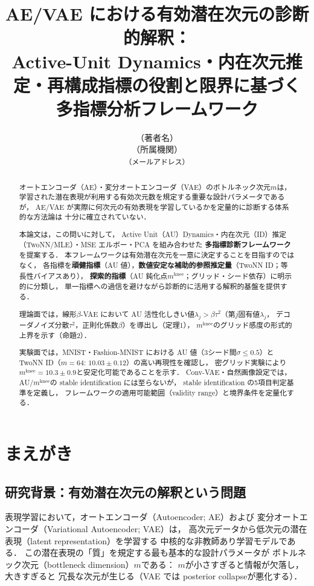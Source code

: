 \documentclass[11pt,a4paper]{jsarticle}
\title{AE/VAE における有効潜在次元の診断的解釈：\\
       Active-Unit Dynamics・内在次元推定・再構成指標の役割と限界に基づく\\
       多指標分析フレームワーク}
\author{（著者名）\\
{\small （所属機関）}\\
{\small \texttt{（メールアドレス）}}}
\date{}
\newcommand{\mknee}{m^{\mathrm{knee}}}
\begin{document}
\maketitle

\begin{abstract}
オートエンコーダ（AE）・変分オートエンコーダ（VAE）のボトルネック次元$m$は，
学習された潜在表現が利用する有効次元数を規定する重要な設計パラメータであるが，
AE/VAE が実際に何次元の有効表現を学習しているかを定量的に診断する体系的な方法論は
十分に確立されていない．

本論文は，この問いに対して，
Active Unit（AU）Dynamics・内在次元（ID）推定（TwoNN/MLE）・MSE エルボー・PCA を組み合わせた
\textbf{多指標診断フレームワーク}を提案する．
本フレームワークは有効潜在次元を一意に決定することを目指すのではなく，
各指標を\textbf{頑健指標}（AU 値），\textbf{数値安定な補助的参照推定量}（TwoNN ID；等長性バイアスあり），
\textbf{探索的指標}（AU 鈍化点$\mknee$；グリッド・シード依存）に明示的に分類し，
単一指標への過信を避けながら診断的に活用する解釈的基盤を提供する．

理論面では，線形$\beta$-VAE において AU 活性化しきい値$\lambda_j > \beta\tau^2$（第$j$固有値$\lambda_j$，
デコーダノイズ分散$\tau^2$，正則化係数$\beta$）を導出し（定理1），
$\mknee$のグリッド感度の形式的上界を示す（命題2）．

実験面では，MNIST・Fashion-MNIST における AU 値（3シード間$\sigma \leq 0.5$）と
TwoNN ID（$m=64$: $10.03 \pm 0.12$）の高い再現性を確認し，
密グリッド実験により$\mknee = 10.3 \pm 0.9$と安定化可能であることを示す．
Conv-VAE・自然画像設定では，AU/$\mknee$の stable identification には至らないが，
stable identification の5項目判定基準を定義し，
フレームワークの適用可能範囲（validity range）と境界条件を定量化する．
\end{abstract}

\section{まえがき}\label{sec:intro}

\subsection{研究背景：有効潜在次元の解釈という問題}\label{sec:intro_bg}

表現学習において，オートエンコーダ（Autoencoder; AE）および
変分オートエンコーダ（Variational Autoencoder; VAE）\cite{kingma2014vae}は，
高次元データから低次元の潜在表現（latent representation）を学習する
中核的な非教師あり学習モデルである\cite{bengio2013representation}．
この潜在表現の「質」を規定する最も基本的な設計パラメータが
ボトルネック次元（bottleneck dimension）$m$である：
$m$が小さすぎると情報が欠落し，大きすぎると
冗長な次元が生じる（VAE では posterior collapse\cite{lucas2019elbo}が悪化する）．
\end{document}
